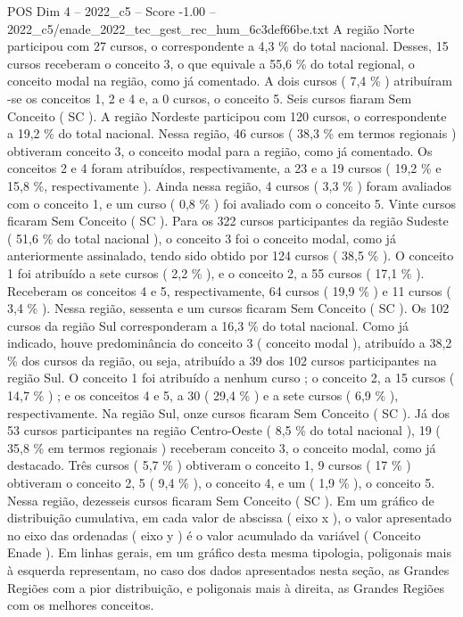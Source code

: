 \begin{textsample}{POS Dim 4 – 2022\_c5 – Score -1.00 – 2022\_c5/enade\_2022\_tec\_gest\_rec\_hum\_6c3def66be.txt}
A região Norte participou com 27 cursos, o correspondente a 4,3 \% do total nacional.
Desses, 15 cursos receberam o conceito 3, o que equivale a 55,6 \% do total regional, o conceito modal na região, como já comentado.
A dois cursos ( 7,4 \% ) atribuíram -se os conceitos 1, 2 e 4 e, a 0 cursos, o conceito 5.
Seis cursos fiaram Sem Conceito ( SC ).
A região Nordeste participou com 120 cursos, o correspondente a 19,2 \% do total nacional.
Nessa região, 46 cursos ( 38,3 \% em termos regionais ) obtiveram conceito 3, o conceito modal para a região, como já comentado.
Os conceitos 2 e 4 foram atribuídos, respectivamente, a 23 e a 19 cursos ( 19,2 \% e 15,8 \%, respectivamente ).
Ainda nessa região, 4 cursos ( 3,3 \% ) foram avaliados com o conceito 1, e um curso ( 0,8 \% ) foi avaliado com o conceito 5.
Vinte cursos ficaram Sem Conceito ( SC ).
Para os 322 cursos participantes da região Sudeste ( 51,6 \% do total nacional ), o conceito 3 foi o conceito modal, como já anteriormente assinalado, tendo sido obtido por 124 cursos ( 38,5 \% ).
O conceito 1 foi atribuído a sete cursos ( 2,2 \% ), e o conceito 2, a 55 cursos ( 17,1 \% ).
Receberam os conceitos 4 e 5, respectivamente, 64 cursos ( 19,9 \% ) e 11 cursos ( 3,4 \% ).
Nessa região, sessenta e um cursos ficaram Sem Conceito ( SC ).
Os 102 cursos da região Sul corresponderam a 16,3 \% do total nacional.
Como já indicado, houve predominância do conceito 3 ( conceito modal ), atribuído a 38,2 \% dos cursos da região, ou seja, atribuído a 39 dos 102 cursos participantes na região Sul.
O conceito 1 foi atribuído a nenhum curso ; o conceito 2, a 15 cursos ( 14,7 \% ) ; e os conceitos 4 e 5, a 30 ( 29,4 \% ) e a sete cursos ( 6,9 \% ), respectivamente.
Na região Sul, onze cursos ficaram Sem Conceito ( SC ).
Já dos 53 cursos participantes na região Centro-Oeste ( 8,5 \% do total nacional ), 19 ( 35,8 \% em termos regionais ) receberam conceito 3, o conceito modal, como já destacado.
Três cursos ( 5,7 \% ) obtiveram o conceito 1, 9 cursos ( 17 \% ) obtiveram o conceito 2, 5 ( 9,4 \% ), o conceito 4, e um ( 1,9 \% ), o conceito 5.
Nessa região, dezesseis cursos ficaram Sem Conceito ( SC ).
Em um gráfico de distribuição cumulativa, em cada valor de abscissa ( eixo x ), o valor apresentado no eixo das ordenadas ( eixo y ) é o valor acumulado da variável ( Conceito Enade ).
Em linhas gerais, em um gráfico desta mesma tipologia, poligonais mais à esquerda representam, no caso dos dados apresentados nesta seção, as Grandes Regiões com a pior distribuição, e poligonais mais à direita, as Grandes Regiões com os melhores conceitos.

\end{textsample}
